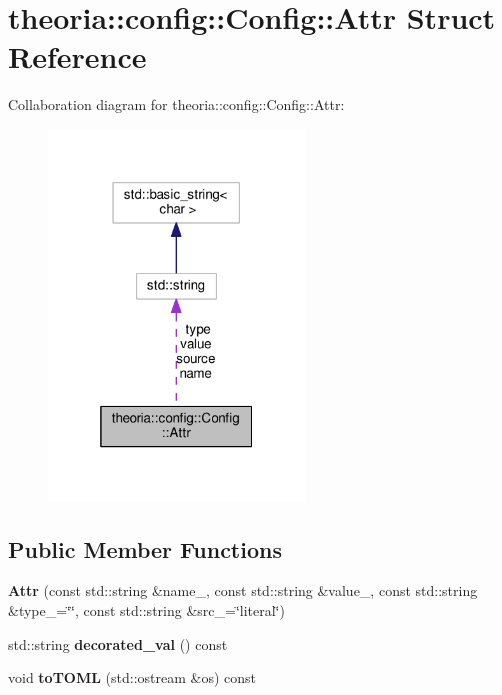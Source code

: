 \hypertarget{structtheoria_1_1config_1_1Config_1_1Attr}{\section{theoria\+:\+:config\+:\+:Config\+:\+:Attr Struct Reference}
\label{structtheoria_1_1config_1_1Config_1_1Attr}
}


Collaboration diagram for theoria\+:\+:config\+:\+:Config\+:\+:Attr\+:
\nopagebreak
\begin{figure}[H]
\begin{center}
\leavevmode
\includegraphics[width=193pt]{structtheoria_1_1config_1_1Config_1_1Attr__coll__graph}
\end{center}
\end{figure}
\subsection*{Public Member Functions}
\begin{DoxyCompactItemize}
\item 
\hypertarget{structtheoria_1_1config_1_1Config_1_1Attr_ab06451bb786404d66a1fce58229310f6}{{\bfseries Attr} (const std\+::string \&name\+\_\+, const std\+::string \&value\+\_\+, const std\+::string \&type\+\_\+=\char`\"{}\char`\"{}, const std\+::string \&src\+\_\+=\char`\"{}literal\char`\"{})}\label{structtheoria_1_1config_1_1Config_1_1Attr_ab06451bb786404d66a1fce58229310f6}

\item 
\hypertarget{structtheoria_1_1config_1_1Config_1_1Attr_a61bf523cf46cda0ba0d164527afd0d9a}{std\+::string {\bfseries decorated\+\_\+val} () const }\label{structtheoria_1_1config_1_1Config_1_1Attr_a61bf523cf46cda0ba0d164527afd0d9a}

\item 
\hypertarget{structtheoria_1_1config_1_1Config_1_1Attr_a833a679c41ba5783a1e1806054dadd68}{void {\bfseries to\+T\+O\+M\+L} (std\+::ostream \&os) const }\label{structtheoria_1_1config_1_1Config_1_1Attr_a833a679c41ba5783a1e1806054dadd68}

\end{DoxyCompactItemize}
